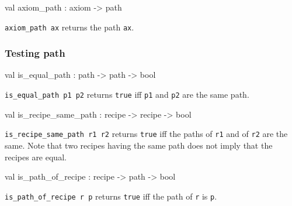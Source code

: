 \label{val:Recipe.axiom-underscorepath}\begin{ocamldoccode}
val axiom_path : axiom -> path
\end{ocamldoccode}
\begin{ocamldocdescription}
{\tt{axiom\_path ax}} returns the path {\tt{ax}}.


\end{ocamldocdescription}




\subsubsection{Testing path}




\label{val:Recipe.is-underscoreequal-underscorepath}\begin{ocamldoccode}
val is_equal_path : path -> path -> bool
\end{ocamldoccode}
\begin{ocamldocdescription}
{\tt{is\_equal\_path p1 p2}} returns {\tt{true}} iff {\tt{p1}} and {\tt{p2}} are the same path.


\end{ocamldocdescription}




\label{val:Recipe.is-underscorerecipe-underscoresame-underscorepath}\begin{ocamldoccode}
val is_recipe_same_path : recipe -> recipe -> bool
\end{ocamldoccode}
\begin{ocamldocdescription}
{\tt{is\_recipe\_same\_path r1 r2}} returns {\tt{true}} iff the paths of {\tt{r1}} and of {\tt{r2}} are the same. 
    Note that two recipes having the same path does not imply that the recipes are equal.


\end{ocamldocdescription}




\label{val:Recipe.is-underscorepath-underscoreof-underscorerecipe}\begin{ocamldoccode}
val is_path_of_recipe : recipe -> path -> bool
\end{ocamldoccode}
\begin{ocamldocdescription}
{\tt{is\_path\_of\_recipe r p}} returns {\tt{true}} iff the path of {\tt{r}} is {\tt{p}}.


\end{ocamldocdescription}




